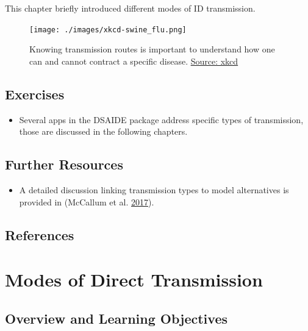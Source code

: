 \documentclass[
]{book}
\providecommand{\tightlist}{%
  \setlength{\itemsep}{0pt}\setlength{\parskip}{0pt}}
\begin{document}
This chapter briefly introduced different modes of ID transmission.

\begin{figure}
\centering
\texttt{[image: ./images/xkcd-swine\_flu.png]}
\caption{Knowing transmission routes is important to understand how one can and cannot contract a specific disease. \href{https://xkcd.com/574/}{Source: xkcd}}
\end{figure}

\hypertarget{exercises-4}{%
\section{Exercises}\label{exercises-4}}

\begin{itemize}
\tightlist
\item
  Several apps in the DSAIDE package address specific types of transmission, those are discussed in the following chapters.
\end{itemize}

\hypertarget{further-resources-4}{%
\section{Further Resources}\label{further-resources-4}}

\begin{itemize}
\tightlist
\item
  A detailed discussion linking transmission types to model alternatives is provided in (McCallum et al. \protect\hyperlink{ref-mccallum17}{2017}).
\end{itemize}

\hypertarget{references-5}{%
\section{References}\label{references-5}}

\hypertarget{modes-of-direct-transmission}{%
\chapter{Modes of Direct Transmission}\label{modes-of-direct-transmission}}

\hypertarget{overview-and-learning-objectives-5}{%
\section{Overview and Learning Objectives}\label{overview-and-learning-objectives-5}}
\end{document}

